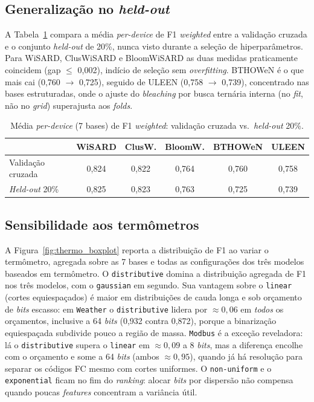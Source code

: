 \subsection{Generalização no \emph{held-out}}

A Tabela~\ref{tab:wisard_holdout} compara a média \emph{per-device} de
F1 \emph{weighted} entre a validação cruzada e o conjunto
\emph{held-out} de 20\%, nunca visto durante a seleção de
hiperparâmetros. Para WiSARD, ClusWiSARD e BloomWiSARD as duas medidas
praticamente coincidem (gap $\le$ 0{,}002), indício de seleção sem
\emph{overfitting}. BTHOWeN é o que mais cai
(0{,}760 $\rightarrow$ 0{,}725), seguido de ULEEN
(0{,}758 $\rightarrow$ 0{,}739), concentrado nas bases estruturadas,
onde o ajuste do \emph{bleaching} por busca ternária interna (no
\emph{fit}, não no \emph{grid}) superajusta aos \emph{folds}.

\begin{table}[ht]
  \centering
  \caption{Média \emph{per-device} (7 bases) de F1 \emph{weighted}:
           validação cruzada vs.\ \emph{held-out} 20\%.}
  \label{tab:wisard_holdout}
  \small
  \begin{tabular}{lccccc}
    \toprule
    & \textbf{WiSARD} & \textbf{ClusW.} & \textbf{BloomW.} & \textbf{BTHOWeN} & \textbf{ULEEN} \\
    \midrule
    Validação cruzada & 0{,}824 & 0{,}822 & 0{,}764 & 0{,}760 & 0{,}758 \\
    \emph{Held-out} 20\% & 0{,}825 & 0{,}823 & 0{,}763 & 0{,}725 & 0{,}739 \\
    \bottomrule
  \end{tabular}
\end{table}

\subsection{Sensibilidade aos termômetros}

A Figura~\ref{fig:thermo_boxplot} reporta a distribuição de F1 ao
variar o termômetro, agregada sobre as 7 bases e todas as
configurações dos três modelos baseados em termômetro. O
\texttt{distributive} domina a distribuição agregada de F1 nos três
modelos, com o \texttt{gaussian} em segundo. Sua vantagem sobre o
\texttt{linear} (cortes equiespaçados) é maior em distribuições de cauda
longa e sob orçamento de \emph{bits} escasso: em \texttt{Weather} o
\texttt{distributive} lidera por $\approx 0{,}06$ em \emph{todos} os
orçamentos, inclusive a 64 \emph{bits} (0{,}932 contra 0{,}872), porque
a binarização equiespaçada subdivide pouco a região de massa.
\texttt{Modbus} é a exceção reveladora: lá o \texttt{distributive}
supera o \texttt{linear} em $\approx 0{,}09$ a 8 \emph{bits}, mas a
diferença encolhe com o orçamento e some a 64 \emph{bits} (ambos
$\approx 0{,}95$), quando já há resolução para separar os códigos FC
mesmo com cortes uniformes. O \texttt{non-uniform} e o \texttt{exponential}
ficam no fim do \emph{ranking}: alocar \emph{bits} por dispersão não
compensa quando poucas \emph{features} concentram a variância útil.

